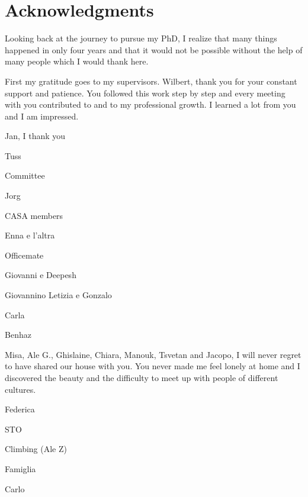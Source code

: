 \clearpage{\pagestyle{empty}\cleardoublepage}

\chapter*{Acknowledgments}
\markboth{}{}
Looking back at the journey to pursue my PhD, I realize that many things happened in only four years and that it would not be possible without the help of many people which I would thank here. 

First my gratitude goes to my supervisors.
Wilbert, thank you for your constant support and patience. You followed this work step by step and every meeting with you contributed %
to and to my professional growth.    
I learned a lot from you and I am impressed.

Jan, I thank you 

Tuss

Committee 

Jorg

CASA members

Enna e l'altra

Officemate 


Giovanni e Deepesh

Giovannino Letizia e Gonzalo

Carla

Benhaz

Misa, Ale G., Ghislaine, Chiara, Manouk, Tsvetan and Jacopo, I will never regret to have shared our house with you. You never made me feel lonely at home and I discovered the beauty and the difficulty to meet up with people of different cultures. %

Federica

STO

Climbing (Ale Z)

Famiglia

Carlo




